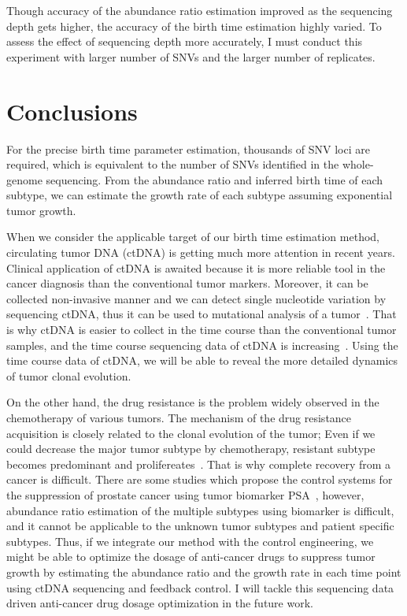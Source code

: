 \documentclass{article}
\begin{document}
Though accuracy of the abundance ratio estimation improved as the sequencing depth gets higher, the accuracy of the birth time estimation highly varied.
To assess the effect of sequencing depth more accurately, I must conduct this experiment with larger number of SNVs and the larger number of replicates.

\section{Conclusions}
 For the precise birth time parameter estimation, thousands of SNV loci are required, which is equivalent to the number of SNVs identified in the whole-genome sequencing. From the abundance ratio and inferred birth time of each subtype, we can estimate the growth rate of each subtype assuming exponential tumor growth.

 When we consider the applicable target of our birth time estimation method, circulating tumor DNA (ctDNA) is getting much more attention in recent years.
 Clinical application of ctDNA is awaited because it is more reliable tool in the cancer diagnosis than the conventional tumor markers.
 Moreover, it can be collected non-invasive manner and we can detect single nucleotide variation by sequencing ctDNA, thus it can be used to mutational analysis of a tumor~\cite{lohr2014whole}.
 That is why ctDNA is easier to collect in the time course than the conventional tumor samples, and the time course sequencing data of ctDNA is increasing~\cite{murtaza2013non}.
 Using the time course data of ctDNA, we will be able to reveal the more detailed dynamics of tumor clonal evolution.
 
 On the other hand, the drug resistance is the problem widely observed in the chemotherapy of various tumors. The mechanism of the drug resistance acquisition is closely related to the clonal evolution of the tumor; Even if we could decrease the major tumor subtype by chemotherapy, resistant subtype becomes predominant and prolifereates~\cite{landau2014clonal}.
 That is why complete recovery from a cancer is difficult. There are some studies which propose the control systems for the suppression of prostate cancer using tumor biomarker PSA~\cite{ideta2008mathematical}, however, abundance ratio estimation of the multiple subtypes using biomarker is difficult, and it cannot be applicable to the unknown tumor subtypes and patient specific subtypes.
 Thus, if we integrate our method with the control engineering, we might be able to optimize the dosage of anti-cancer drugs to suppress tumor growth by estimating the abundance ratio and the growth rate in each time point using ctDNA sequencing and feedback control.
 I will tackle this sequencing data driven anti-cancer drug dosage optimization in the future work.
\end{document}
